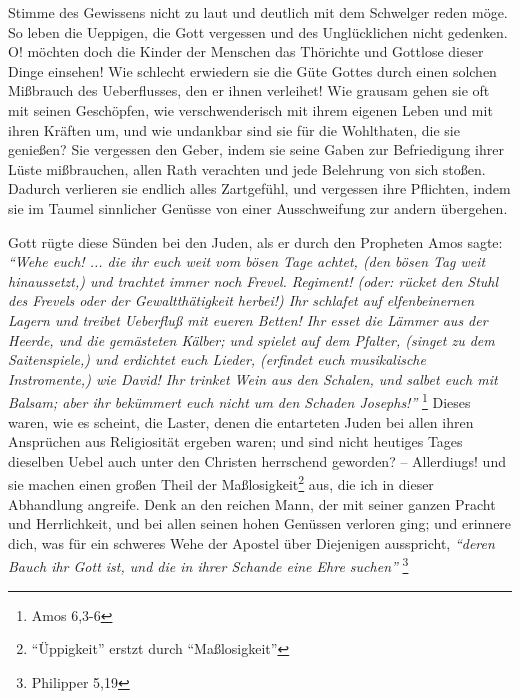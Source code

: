 Stimme des Gewissens nicht zu laut und deutlich mit dem Schwelger reden möge. So
leben die Ueppigen, die Gott vergessen und des Unglücklichen nicht gedenken. O!
möchten doch die Kinder der Menschen das Thörichte und Gottlose dieser Dinge
einsehen! Wie schlecht erwiedern sie die Güte Gottes durch einen solchen
Mißbrauch des Ueberflusses, den er ihnen verleihet! Wie grausam gehen sie oft
mit seinen Geschöpfen, wie verschwenderisch mit ihrem eigenen Leben und mit
ihren Kräften um, und wie undankbar sind sie für die Wohlthaten, die sie
genießen? Sie vergessen den Geber, indem sie seine Gaben zur Befriedigung ihrer
Lüste mißbrauchen, allen Rath verachten und jede Belehrung von sich stoßen.
Dadurch verlieren sie endlich alles Zartgefühl, und vergessen ihre Pflichten,
indem sie im Taumel sinnlicher Genüsse von einer Ausschweifung zur andern
übergehen.

\medskip

Gott rügte diese Sünden bei den Juden, als er durch den Propheten Amos sagte:
\textit{"`Wehe euch! ... die ihr euch weit vom bösen Tage achtet, (den bösen Tag weit
hinaussetzt,) und trachtet immer noch Frevel. Regiment! (oder: rücket den Stuhl
des Frevels oder der Gewaltthätigkeit herbei!) Ihr schlafet auf elfenbeinernen
 Lagern und treibet Ueberfluß mit eueren Betten! Ihr esset die Lämmer aus der
Heerde, und die gemästeten Kälber; und spielet auf dem Pfalter, (singet zu dem
Saitenspiele,) und erdichtet euch Lieder, (erfindet euch musikalische
Instromente,) wie David! Ihr trinket Wein aus den Schalen, und salbet euch mit
Balsam; aber ihr bekümmert euch nicht um den Schaden Josephs!"'}
\footnote{Amos 6,3-6}
Dieses waren, wie es scheint, die Laster, denen die entarteten
Juden bei allen ihren Ansprüchen aus Religiosität ergeben waren; und sind nicht
heutiges Tages dieselben Uebel auch unter den Christen herrschend geworden? --
Allerdiugs! und sie machen einen großen Theil der Maßlosigkeit\footnote{"`Üppigkeit"' erstzt durch "`Maßlosigkeit"'} aus, die ich in
dieser Abhandlung angreife. Denk an den reichen Mann, der mit seiner ganzen
Pracht und Herrlichkeit, und bei allen seinen hohen Genüssen verloren ging; und
erinnere dich, was für ein schweres Wehe der Apostel über Diejenigen ausspricht,
\textit{"`deren Bauch ihr Gott ist, und die in ihrer Schande eine Ehre suchen"'}
\footnote{Philipper 5,19}

